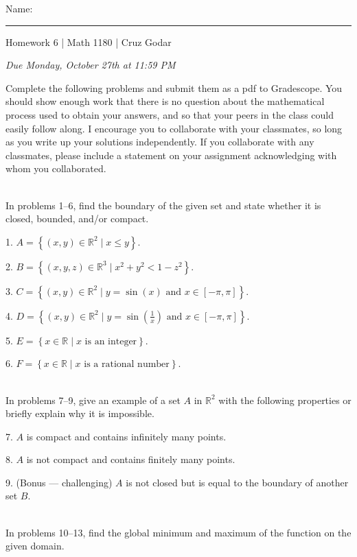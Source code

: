 \documentclass{article}
\begin{document}
\Large Name: \rule{2in}{0.15mm} \hfill Homework 6 | Math 1180 | Cruz Godar \vspace{4pt}  \normalsize

\textit{Due Monday, October 27th at 11:59 PM}

Complete the following problems and submit them as a pdf to Gradescope. You should show enough work that there is no question about the mathematical process used to obtain your answers, and so that your peers in the class could easily follow along. I encourage you to collaborate with your classmates, so long as you write up your solutions independently. If you collaborate with any classmates, please include a statement on your assignment acknowledging with whom you collaborated.

~\\

In problems 1--6, find the boundary of the given set and state whether it is closed, bounded, and/or compact.

1. $A = \left\{ (x, y) \in \mathbb{R}^2 \mid x \leq y \right\}$.

2. $B = \left\{ (x, y, z) \in \mathbb{R}^3 \mid x^2 + y^2 < 1 - z^2 \right\}$.

3. $C = \left\{ (x, y) \in \mathbb{R}^2 \mid y = \sin(x) \text{ and } x \in [-\pi, \pi] \right\}$.

4. $D = \left\{ (x, y) \in \mathbb{R}^2 \mid y = \sin\left( \frac{1}{x} \right) \text{ and } x \in [-\pi, \pi] \right\}$.

5. $E = \left\{ x \in \mathbb{R} \mid x \text{ is an integer} \right\}$.

6. $F = \left\{ x \in \mathbb{R} \mid x \text{ is a rational number} \right\}$.

~\\

In problems 7--9, give an example of a set $A$ in $\mathbb{R}^2$ with the following properties or briefly explain why it is impossible.

7. $A$ is compact and contains infinitely many points.

8. $A$ is not compact and contains finitely many points.

9. (Bonus --- challenging) $A$ is not closed but is equal to the boundary of another set $B$.

~\\

In problems 10--13, find the global minimum and maximum of the function on the given domain.
\end{document}
